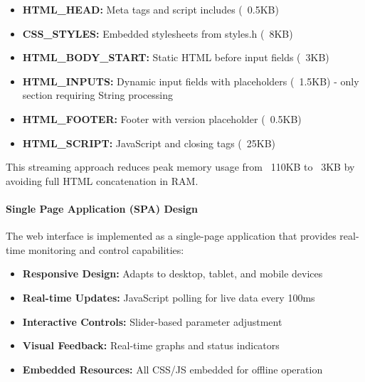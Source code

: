 \documentclass[12pt,a4paper]{article}
\begin{document}
\begin{itemize}
    \item \textbf{HTML\_HEAD:} Meta tags and script includes (~0.5KB)
    \item \textbf{CSS\_STYLES:} Embedded stylesheets from styles.h (~8KB)
    \item \textbf{HTML\_BODY\_START:} Static HTML before input fields (~3KB)
    \item \textbf{HTML\_INPUTS:} Dynamic input fields with placeholders (~1.5KB) - only section requiring String processing
    \item \textbf{HTML\_FOOTER:} Footer with version placeholder (~0.5KB)
    \item \textbf{HTML\_SCRIPT:} JavaScript and closing tags (~25KB)
\end{itemize}

This streaming approach reduces peak memory usage from ~110KB to ~3KB by avoiding full HTML concatenation in RAM.

\paragraph{Single Page Application (SPA) Design}
The web interface is implemented as a single-page application that provides real-time monitoring and control capabilities:

\begin{itemize}
    \item \textbf{Responsive Design:} Adapts to desktop, tablet, and mobile devices
    \item \textbf{Real-time Updates:} JavaScript polling for live data every 100ms
    \item \textbf{Interactive Controls:} Slider-based parameter adjustment
    \item \textbf{Visual Feedback:} Real-time graphs and status indicators
    \item \textbf{Embedded Resources:} All CSS/JS embedded for offline operation
\end{itemize}
\end{document}

